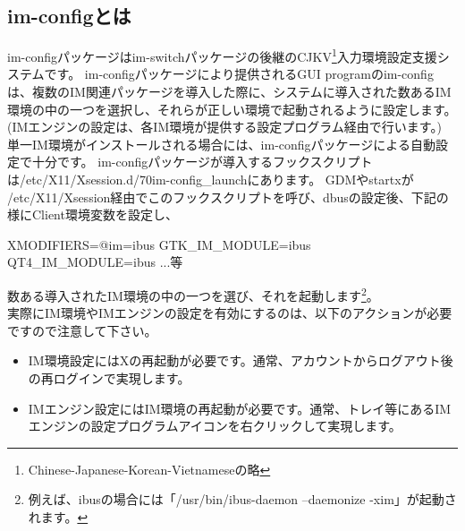 \documentclass[mingoth,a4paper]{jsarticle}
\begin{document}
\subsection{im-configとは}
im-configパッケージはim-switchパッケージの後継のCJKV\footnote{Chinese-Japanese-Korean-Vietnameseの略}入力環境設定支援システムです。
im-configパッケージにより提供されるGUI programのim-configは、複数のIM関連パッケージを導入した際に、システムに導入された数あるIM環境の中の一つを選択し、それらが正しい環境で起動されるように設定します。(IMエンジンの設定は、各IM環境が提供する設定プログラム経由で行います。)
単一IM環境がインストールされる場合には、im-configパッケージによる自動設定で十分です。
im-configパッケージが導入するフックスクリプトは/etc/X11/Xsession.d/70im-config\_launchにあります。
GDMやstartxが /etc/X11/Xsession経由でこのフックスクリプトを呼び、dbusの設定後、下記の様にClient環境変数を設定し、
\begin{commandline}
XMODIFIERS=@im=ibus
GTK_IM_MODULE=ibus
QT4_IM_MODULE=ibus
...等
\end{commandline}
数ある導入されたIM環境の中の一つを選び、それを起動します\footnote{例えば、ibusの場合には「/usr/bin/ibus-daemon --daemonize -xim」が起動されます。}。
\\
実際にIM環境やIMエンジンの設定を有効にするのは、以下のアクションが必要ですので注意して下さい。
\begin{itemize}
\item IM環境設定にはXの再起動が必要です。通常、アカウントからログアウト後の再ログインで実現します。
\item IMエンジン設定にはIM環境の再起動が必要です。通常、トレイ等にあるIMエンジンの設定プログラムアイコンを右クリックして実現します。
\end{itemize}
\clearpage
\end{document}

